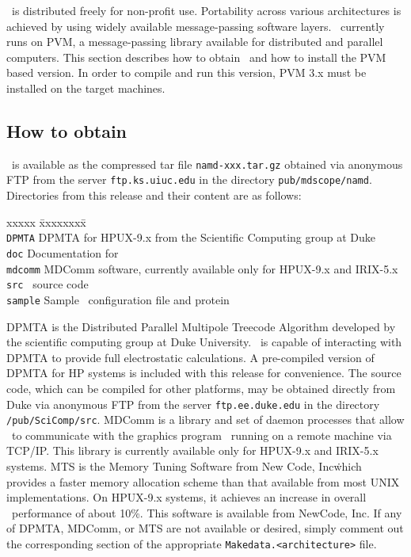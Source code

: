 \NAMD\ is distributed freely for non-profit use.  Portability 
across various architectures is achieved by using widely available 
message-passing software layers.  \NAMD\ currently runs on 
PVM, a message-passing library available for distributed and 
parallel computers.  
\prettypar
This section describes how to obtain \NAMD\ and how to install the PVM based 
version.  In order to compile and run this version, PVM 3.x must be 
installed on the target machines.  

\subsection{How to obtain \NAMD}

\NAMD\ is available as the compressed tar file 
{\tt namd-xxx.tar.gz} obtained via anonymous 
FTP from the server {\tt ftp.ks.uiuc.edu} in the directory 
{\tt pub/mdscope/namd}.  
Directories from this release and their content are as follows: 
\begin{tabbing}
xxxxx \= xxxxxxxx\= \kill \\
\> {\tt DPMTA} \>
         DPMTA for HPUX-9.x from the Scientific Computing group at Duke \\
\> {\tt doc} \> 
         Documentation for \NAMD\ \\
\> {\tt mdcomm} \> 
         MDComm software, currently available only for HPUX-9.x and 
IRIX-5.x \\ 
\> {\tt src} \>
         \NAMD\ source code \\
\> {\tt sample} \>
         Sample \NAMD\ configuration file and protein
\end{tabbing}

DPMTA is the Distributed Parallel Multipole Treecode Algorithm 
developed by the scientific computing group at Duke University.  
\NAMD\ is capable of interacting with DPMTA to provide full electrostatic 
calculations.  A pre-compiled version of DPMTA for HP systems is included 
with this release for convenience.  The source code, 
which can be compiled for other platforms, 
may be obtained directly from Duke via anonymous FTP from 
the server {\tt ftp.ee.duke.edu} in the directory {\tt /pub/SciComp/src}.
\prettypar
MDComm is a library and set of daemon processes that allow \NAMD\ to 
communicate with the graphics program \VMD\ running on a remote machine 
via TCP/IP.  This library is currently available only for HPUX-9.x and 
IRIX-5.x systems.  
\prettypar
MTS is the Memory Tuning Software from New Code, Inc\. which provides a 
faster memory allocation scheme than that available from most UNIX 
implementations.  On HPUX-9.x systems, it achieves an increase in overall 
\NAMD\ performance of about 10\%.  This software is available from
NewCode, Inc.
\prettypar
If any of 
DPMTA, MDComm, or MTS are not available or desired, simply comment 
out the corresponding 
section of the appropriate \verb+Makedata.<architecture>+ file.  

